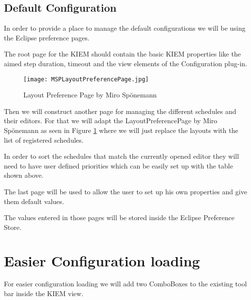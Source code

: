 \subsection{Default Configuration}
\label{section:ConfConceptsDefaultConf}
In order to provide a place to manage the default configurations we will be
using the Eclipse preference pages.

The root page for the \ac{KIEM} should contain the basic KIEM properties like
the aimed step duration, timeout and the view elements of the Configuration
plug-in.

\begin{figure}[MSPLayoutPreferencePage]
  \centering
  \texttt{[image: MSPLayoutPreferencePage.jpg]}
  \caption[Layout Preference Page by Miro Sp\"onemann]%
  {Layout Preference Page by Miro Sp\"onemann\protect\footnotemark}
  \label{fig:MSPLayoutPreferencePage}
\end{figure}

Then we will construct another page for managing the different schedules
and their editors. For that we will adapt the LayoutPreferencePage by Miro Sp\"onemann
as seen in Figure \ref{fig:MSPLayoutPreferencePage} where we will just replace the 
layouts with the list of registered schedules.

In order to sort the schedules that match the currently opened editor they will
need to have user defined priorities which can be easily set up with the table
shown above.

The last page will be used to allow the user to set up his own properties and give them
default values.

The values entered in those pages will be stored inside the Eclipse Preference
Store.


\section{Easier Configuration loading}
\label{section:ConfConceptsEasyLoading}
For easier configuration loading we will add two ComboBoxes to the existing
tool bar inside the \ac{KIEM} view.

